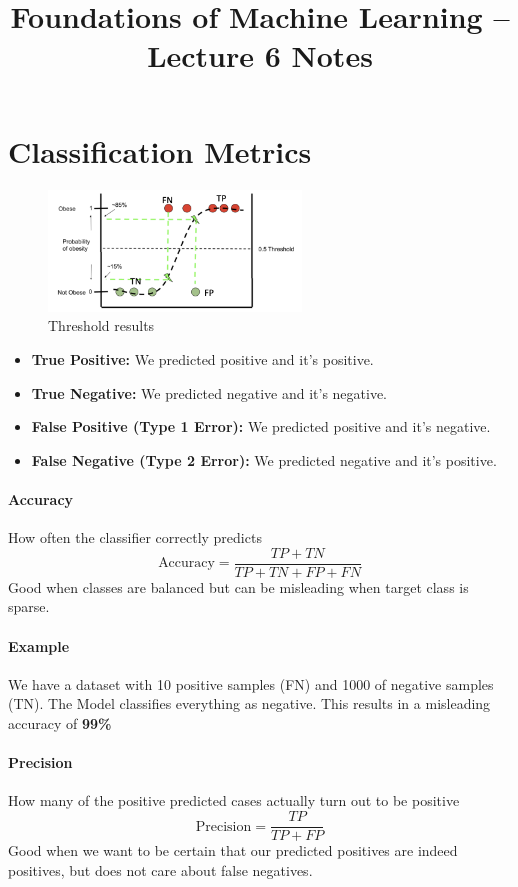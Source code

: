 \documentclass[11pt]{article}
\title{Foundations of Machine Learning -- Lecture 6 Notes}
\author{}
\date{}
\begin{document}
\maketitle

\section*{Classification Metrics}

\begin{figure}[h]
	\centering
	\includegraphics[width=0.6\textwidth]{../imgs/tnfn.png} %
	\caption{Threshold results}
\end{figure}

\begin{itemize}
	\item \textbf{True Positive:} We predicted positive and it's positive.
	\item \textbf{True Negative:} We predicted negative and it's negative.
	\item \textbf{False Positive (Type 1 Error):} We predicted positive and it's negative.
	\item \textbf{False Negative (Type 2 Error):} We predicted negative and it's positive.
\end{itemize}

\paragraph*{Accuracy}
How often the classifier correctly predicts
\[
	\text{Accuracy} = \frac{TP + TN}{TP + TN + FP + FN}
\]
Good when classes are balanced but can be misleading when target class is sparse.
\paragraph*{Example}
We have a dataset with 10 positive samples (FN)
and 1000 of negative samples (TN). The Model classifies everything as negative.
This results in a misleading accuracy of \textbf{99\%}%

\paragraph*{Precision}
How many of the positive predicted cases actually turn out to be positive
\[
	\text{Precision} = \frac{TP}{TP+FP}
\]
Good when we want to be certain that our predicted positives are indeed positives,
but does not care about false negatives.
\end{document}
